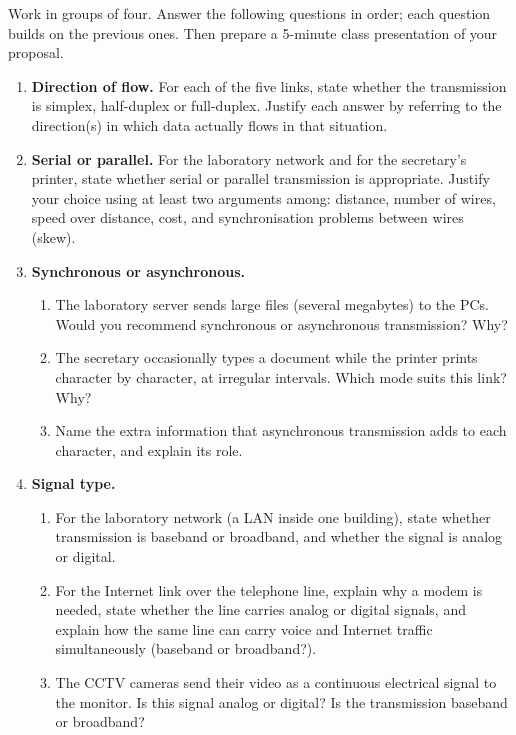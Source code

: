 \documentclass[11pt]{article}
\newcommand{\cle}[1]{{\popxbold\color{popdark}#1}}
\begin{document}
Work in groups of four. Answer the following questions in order; each question builds on the previous ones. Then prepare a 5-minute class presentation of your proposal.

\begin{enumerate}
\item \textbf{Direction of flow.} For each of the five links, state whether the transmission is \cle{simplex}, \cle{half-duplex} or \cle{full-duplex}. Justify each answer by referring to the direction(s) in which data actually flows in that situation.

\item \textbf{Serial or parallel.} For the laboratory network and for the secretary's printer, state whether \cle{serial} or \cle{parallel} transmission is appropriate. Justify your choice using at least two arguments among: distance, number of wires, speed over distance, cost, and synchronisation problems between wires (skew).

\item \textbf{Synchronous or asynchronous.} 
\begin{enumerate}
\item The laboratory server sends large files (several megabytes) to the PCs. Would you recommend synchronous or asynchronous transmission? Why?
\item The secretary occasionally types a document while the printer prints character by character, at irregular intervals. Which mode suits this link? Why?
\item Name the extra information that asynchronous transmission adds to each character, and explain its role.
\end{enumerate}

\item \textbf{Signal type.} 
\begin{enumerate}
\item For the laboratory network (a LAN inside one building), state whether transmission is \cle{baseband} or \cle{broadband}, and whether the signal is \cle{analog} or \cle{digital}.
\item For the Internet link over the telephone line, explain why a \cle{modem} is needed, state whether the line carries analog or digital signals, and explain how the same line can carry voice and Internet traffic simultaneously (baseband or broadband?).
\item The CCTV cameras send their video as a continuous electrical signal to the monitor. Is this signal analog or digital? Is the transmission baseband or broadband?
\end{enumerate}


\end{enumerate}
\end{document}
